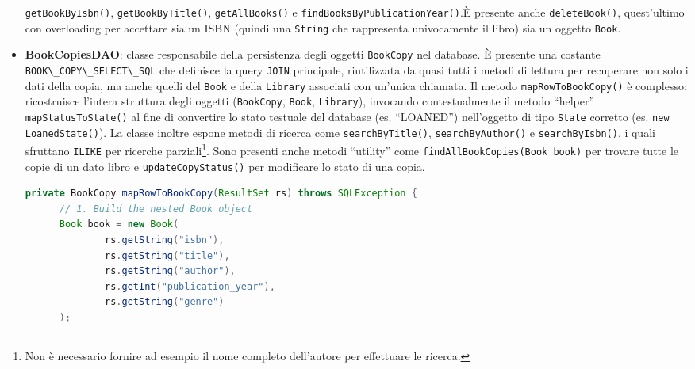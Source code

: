\documentclass[
  italian,
  paper=a4,
  ,captions=tableheading
]{scrbook}
\newcommand{\passthrough}[1]{#1}
\begin{document}
\begin{itemize}
  \passthrough{\lstinline!getBookByIsbn()!},
  \passthrough{\lstinline!getBookByTitle()!},
  \passthrough{\lstinline!getAllBooks()!} e
  \passthrough{\lstinline!findBooksByPublicationYear()!}.È presente
  anche \passthrough{\lstinline!deleteBook()!}, quest'ultimo con
  overloading per accettare sia un ISBN (quindi una
  \passthrough{\lstinline!String!} che rappresenta univocamente il
  libro) sia un oggetto \passthrough{\lstinline!Book!}.
\item
  \textbf{BookCopiesDAO}: classe responsabile della persistenza degli
  oggetti \passthrough{\lstinline!BookCopy!} nel database. È presente
  una costante \passthrough{\lstinline!BOOK\_COPY\_SELECT\_SQL!} che
  definisce la query \passthrough{\lstinline!JOIN!} principale,
  riutilizzata da quasi tutti i metodi di lettura per recuperare non
  solo i dati della copia, ma anche quelli del
  \passthrough{\lstinline!Book!} e della
  \passthrough{\lstinline!Library!} associati con un'unica chiamata. Il
  metodo \passthrough{\lstinline!mapRowToBookCopy()!} è complesso:
  ricostruisce l'intera struttura degli oggetti
  (\passthrough{\lstinline!BookCopy!}, \passthrough{\lstinline!Book!},
  \passthrough{\lstinline!Library!}), invocando contestualmente il
  metodo ``helper'' \passthrough{\lstinline!mapStatusToState()!} al fine
  di convertire lo stato testuale del database (es. ``LOANED'')
  nell'oggetto di tipo \passthrough{\lstinline!State!} corretto (es.
  \passthrough{\lstinline!new LoanedState()!}). La classe inoltre espone
  metodi di ricerca come \passthrough{\lstinline!searchByTitle()!},
  \passthrough{\lstinline!searchByAuthor()!} e
  \passthrough{\lstinline!searchByIsbn()!}, i quali sfruttano
  \passthrough{\lstinline!ILIKE!} per ricerche
  parziali\footnote{Non è necessario fornire ad esempio il nome completo dell’autore per effettuare le ricerca.}.
  Sono presenti anche metodi ``utility'' come
  \passthrough{\lstinline!findAllBookCopies(Book book)!} per trovare
  tutte le copie di un dato libro e
  \passthrough{\lstinline!updateCopyStatus()!} per modificare lo stato
  di una copia.

\begin{lstlisting}[language=Java, language=Java, caption={Metodo per ricreare un oggetto di tipo BookCopy da una riga del database.}, label={lst:bookcopiesdao}, label=lst:bookcopiesdao]
private BookCopy mapRowToBookCopy(ResultSet rs) throws SQLException {
      // 1. Build the nested Book object
      Book book = new Book(
              rs.getString("isbn"),
              rs.getString("title"),
              rs.getString("author"),
              rs.getInt("publication_year"),
              rs.getString("genre")
      );


\end{lstlisting}
\end{itemize}
\end{document}
